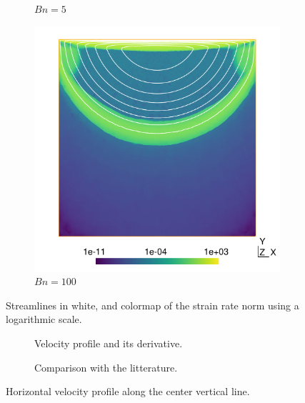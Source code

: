 \documentclass[11 pt]{report}
\begin{document}
\begin{figure}[t]
\begin{subfigure}[t]{0.495\textwidth}
        \caption{$Bn=5$}
        \label{fig:cavity5}
    \end{subfigure}
    \begin{subfigure}[t]{0.495\textwidth}
        \includegraphics[width=\textwidth]{../figures/cavity_100.pdf}
        \caption{$Bn=100$}
        \label{fig:cavity100}
    \end{subfigure}
    \caption{Streamlines in white, and colormap of the strain rate norm using a logarithmic scale.}
    \label{fig:cavity}
\end{figure} 
\vfill

\pagebreak
\vfill
\begin{figure}[t]
    \centering
    \begin{subfigure}[t]{\textwidth}
        \centering
        
        \caption{Velocity profile and its derivative.}
        \label{fig:profilesCavity}
    \end{subfigure}\vspace{15pt}
    \begin{subfigure}[t]{\textwidth}
        \centering
        
        \caption{Comparison with the litterature.}
        \label{fig:compareCavity}
    \end{subfigure}\vspace{15pt}
    \caption{Horizontal velocity profile along the center vertical line.}
\end{figure}
\vfill
\pagebreak
\end{document}
